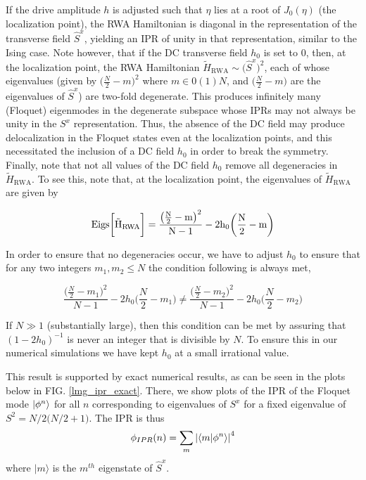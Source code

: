 \documentclass[%
reprint,
superscriptaddress,
amsmath,amssymb,
aps,
prb,
showkeys,
]{revtex4-2}
\begin{document}
	
	If the drive amplitude $h$ is adjusted such that $\eta$ lies at a root of $J_0(\eta)$ (the localization point), the RWA Hamiltonian is diagonal in the representation of the transverse field $\hat{S}^x$, yielding an IPR of unity in that representation, similar to the Ising case. Note however, that if the DC transverse field $h_0$ is set to $0$, then, at the localization point, the RWA Hamiltonian $\tilde{H}_{\mathrm{RWA}}\sim
	\big(\hat{S}^x\big)^2$, each of whose eigenvalues (given by $\big(\frac{N}{2}-m\big)^2$ where $m \in 0(1)N$, and $\big(\frac{N}{2}-m\big)$  are the eigenvalues of $\hat{S}^x$) are two-fold degenerate. This produces infinitely many (Floquet) eigenmodes in the degenerate subspace whose IPRs may not always be unity in the $S^x$ representation. Thus, the absence of the DC field may produce delocalization in the Floquet states even at the localization points, and this necessitated the inclusion of a DC field $h_0$ in order to break the symmetry.
	Finally, note that not all values of the DC field $h_0$ remove all degeneracies in $\tilde{H}_{\mathrm{RWA}}$. To see this, note that, at the localization point, the eigenvalues of $\tilde{H}_{\mathrm{RWA}}$ are given by
	
	\begin{equation}
	\rm{Eigs}\bigg[\tilde{H}_{\mathrm{RWA}}\bigg] = \frac{\big(\frac{N}{2}-m\big)^2}{N-1} - 2h_0 \bigg(\frac{N}{2}-m\bigg)
	\end{equation}
	
	In order to ensure that no degeneracies occur, we have to adjust $h_0$ to ensure that for any two integers $m_1, m_2 \leq N$  the condition following is always met,
	
	\begin{equation}
	\frac{\big(\frac{N}{2}-m_1\big)^2}{N-1} - 2h_0 \bigg(\frac{N}{2}-m_1\bigg) \neq \frac{\big(\frac{N}{2}-m_2\big)^2}{N-1} - 2h_0 \bigg(\frac{N}{2}-m_2\bigg)
	\end{equation}
	
	If $N\gg 1$ (substantially large), then this condition can be met by assuring that $(1-2h_0)^{-1}$ is never an integer that is divisible by $N$. To ensure this in our numerical simulations we have kept $h_0$ at a small irrational value.
	
	
	This result is supported by exact numerical results, as can be seen in the plots below in FIG. \ref{lmg_ipr_exact}. There, we show plots of the IPR of the Floquet mode $\ket{\phi^n}$ for all $n$ corresponding to eigenvalues of $S^x$ for a fixed eigenvalue of $S^2 = N/2\big(N/2 + 1\big)$. The IPR is thus
	\begin{equation}
	\phi_{IPR}(n) = \sum_m \abs{\ip{m}{\phi^n}}^4
	\label{iprlmg}
	\end{equation}
	where $|m\rangle$ is the $m^{th}$ eigenstate of $\hat{S}^x$.
	
\end{document}
